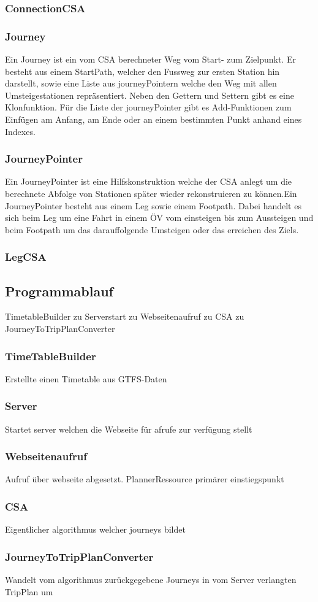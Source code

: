 \subsubsection{ConnectionCSA}

\subsubsection{Journey}
Ein Journey ist ein vom CSA berechneter Weg vom Start- zum Zielpunkt. Er besteht aus einem StartPath, welcher den Fussweg zur ersten Station hin darstellt, sowie eine Liste aus journeyPointern welche den Weg mit allen Umsteigestationen repräsentiert. Neben den Gettern und Settern gibt es eine Klonfunktion. Für die Liste der journeyPointer gibt es Add-Funktionen zum Einfügen am Anfang, am Ende oder an einem bestimmten Punkt anhand eines Indexes.

\subsubsection{JourneyPointer}
Ein JourneyPointer ist eine Hilfskonstruktion welche der CSA anlegt um die berechnete Abfolge von Stationen später wieder rekonstruieren zu können.Ein JourneyPointer besteht aus einem Leg sowie einem Footpath. Dabei handelt es sich beim Leg um eine Fahrt in einem ÖV vom einsteigen bis zum Aussteigen und beim Footpath um das darauffolgende Umsteigen oder das erreichen des Ziels.

\subsubsection{LegCSA}

\subsection{Programmablauf}
TimetableBuilder zu Serverstart zu Webseitenaufruf zu CSA zu JourneyToTripPlanConverter

\subsubsection{TimeTableBuilder}
Erstellte einen Timetable aus GTFS-Daten
\subsubsection{Server}
Startet server welchen die Webseite für afrufe zur verfügung stellt
\subsubsection{Webseitenaufruf}
Aufruf über webseite abgesetzt. PlannerRessource primärer einstiegspunkt
\subsubsection{CSA}
Eigentlicher algorithmus welcher journeys bildet
\subsubsection{JourneyToTripPlanConverter}
Wandelt vom algorithmus zurückgegebene Journeys in vom Server verlangten TripPlan um